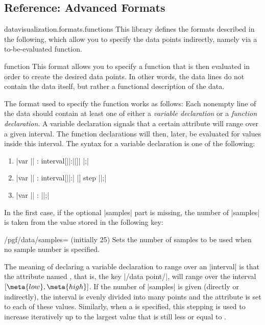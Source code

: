 \subsection{Reference: Advanced Formats}

\begin{tikzlibrary}{datavisualization.formats.functions}
    This library defines the formats described in the following, which allow
    you to specify the data points indirectly, namely via a to-be-evaluated
    function.

    \begin{dataformat}{function}
        This format allows you to specify a function that is then evaluated in
        order to create the desired data points. In other words, the data lines
        do not contain the data itself, but rather a functional description of
        the data.

        The format used to specify the function works as follows: Each nonempty
        line of the data should contain at least one of either a \emph{variable
        declaration} or a \emph{function declaration}. A variable declaration
        signals that a certain attribute will range over a given interval. The
        function declarations will then, later, be evaluated for values inside
        this interval. The syntax for a variable declaration is one of the
        following:
        \begin{enumerate}
            \item |var || : interval[||:||]|
                |;|
            \item |var || : interval[||:|%
                |] step ||;|
            \item |var || : {||};|
        \end{enumerate}
        In the first case, if the optional |samples| part is missing, the
        number of |samples| is taken from the value stored  in the following
        key:
        \begin{key}{/pgf/data/samples= (initially 25)}
            Sets the number of samples to be used when no sample number is
            specified.
        \end{key}
        The meaning of declaring a variable declaration to range over an
        |interval| is that the attribute named , that is, the
        key |/data point/|, will range over the interval
        $[\meta{low},\meta{high}]$. If the number of |samples| is given
        (directly or indirectly), the interval is evenly divided into
         many points and the attribute is set to each of these
        values. Similarly, when a  is specified, this stepping is
        used to increase  iteratively up to the largest value that is
        still less or equal to .


\end{dataformat}
\end{tikzlibrary}
